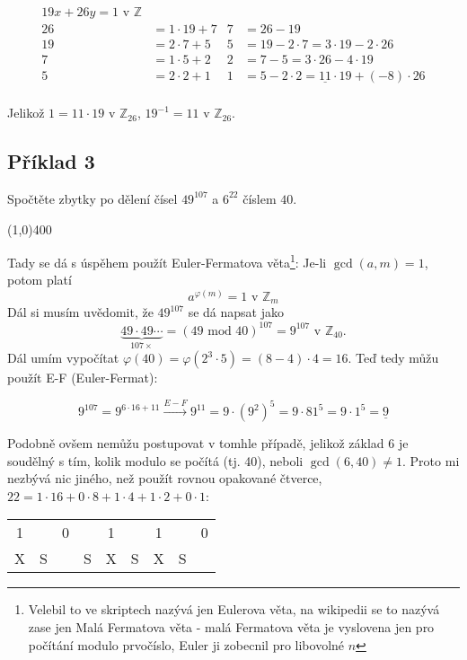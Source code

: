 \documentclass{article}
\begin{document}
\begin{align*}
19x + 26y = 1 \mbox{ v } \mathbb{Z}&  	& 		&  \\
26 & = 1\cdot 19 + 7 					& 7		&= 26 - 19 \\
19 & = 2\cdot 7 + 5						& 5 	&= 19 - 2\cdot 7 = 3\cdot 19 - 2 \cdot 26 \\
7  & = 1\cdot 5 + 2						& 2 	&= 7 - 5 = 3\cdot 26 - 4 \cdot 19 \\
5  & = 2\cdot 2 + 1						& 1 	&= 5 - 2\cdot 2 = \underline{11}\cdot 19 + (-8) \cdot 26 \\
\end{align*}

Jelikož $1 = 11\cdot 19$ v $\mathbb{Z}_{26}$, $19^{-1} = 11$ v $\mathbb{Z}_{26}$.

\subsection{Příklad 3}
Spočtěte zbytky po dělení čísel $49^{107}$ a $6^{22}$ číslem $40$.

\line(1,0){400}

Tady se dá s úspěhem použít Euler-Fermatova věta\footnote{Velebil to ve skriptech nazývá jen Eulerova věta, na wikipedii se to nazývá zase jen Malá Fermatova věta - malá Fermatova věta je vyslovena jen pro počítání modulo prvočíslo, Euler ji zobecnil pro libovolné $n$}:
Je-li $\gcd(a,m) = 1$, potom platí
\begin{equation}
a^{\varphi(m)} = 1 \mbox{ v } \mathbb{Z}_m
\label{euler-fermat}
\end{equation}
Dál si musím uvědomit, že $49^{107}$ se dá napsat jako 
$$ \underbrace{49\cdot 49 \cdots}_{107 \times} = (49 \mbox{ mod } 40)^{107} = 9^{107} \mbox{ v } \mathbb{Z}_{40}.$$
Dál umím vypočítat $\varphi(40) = \varphi(2^3\cdot5) = (8-4)\cdot 4 = 16$. Teď tedy můžu použít E-F (Euler-Fermat):

$$9^{107} = 9^{6\cdot 16 + 11} \stackrel{E-F}{\rightarrow} 9^{11} = 9\cdot(9^2)^5 = 9\cdot{81^5} = 9\cdot 1^5 = \underline{9}$$

Podobně ovšem nemůžu postupovat v tomhle případě, jelikož základ 6 je soudělný s tím, kolik modulo se počítá (tj. 40), neboli $\gcd(6,40) \neq 1$. Proto mi nezbývá nic jiného, než použít rovnou opakované čtverce, $22 = 1\cdot16 + 0\cdot8 + 1\cdot4 + 1\cdot2 + 0\cdot1$:

\begin{center}  %
  \begin{tabular}{c|c|c|c|c|c|c|c|c}
		1 &   & 0 &   & 1 &   & 1 &   & 0\\ 
		X & S &   & S & X &	S & X & S &  \\
	\end{tabular}
\end{center}
\end{document}
